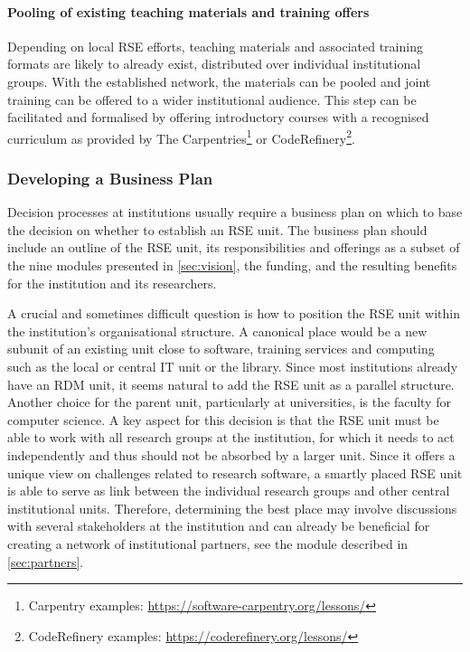 \documentclass[a4paper]{article}
\begin{document}
\paragraph{Pooling of existing teaching materials and training offers}
Depending on local RSE efforts, teaching materials and associated training formats are likely to already exist, distributed over individual institutional groups.
With the established network, the materials can be pooled and joint training can be offered to a wider institutional audience.
This step can be facilitated and formalised by offering introductory courses with a recognised curriculum as provided by The Carpentries\footnote{Carpentry examples: \url{https://software-carpentry.org/lessons/}}
or CodeRefinery\footnote{CodeRefinery examples: \url{https://coderefinery.org/lessons/}}.

\subsubsection{Developing a Business Plan}
Decision processes at institutions usually require a business plan on which to base the decision on whether to establish an RSE unit.
The business plan should include an outline of the RSE unit, its responsibilities and offerings as a subset of the nine modules presented in \autoref{sec:vision}, the funding, and the resulting benefits for the institution and its researchers.

A crucial and sometimes difficult question is how to position the RSE unit within the institution’s organisational structure.
A canonical place would be a new subunit of an existing unit close to software, training services and computing such as the local or central IT unit or the library.
Since most institutions already have an RDM unit, it seems natural to add the RSE unit as a parallel structure.
Another choice for the parent unit, particularly at universities, is the faculty for computer science.
A key aspect for this decision is that the RSE unit must be able to work with all research groups at the institution, for which it needs to act independently and thus should not be absorbed by a larger unit.
Since it offers a unique view on challenges related to research software, a smartly placed RSE unit is able to serve as link between the individual research groups and other central institutional units.
Therefore, determining the best place may involve discussions with several stakeholders at the institution and can already be beneficial for creating a network of institutional partners, see the module described in \autoref{sec:partners}.
\end{document}
